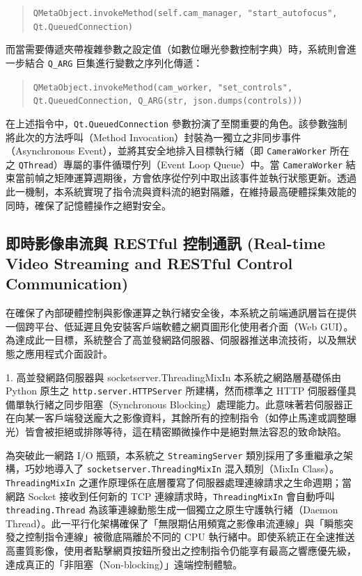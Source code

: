 \begin{quote}
\texttt{QMetaObject.invokeMethod(self.cam\_manager, "start\_autofocus", Qt.QueuedConnection)}
\end{quote}

而當需要傳遞夾帶複雜參數之設定值（如數位曝光參數控制字典）時，系統則會進一步結合 \texttt{Q\_ARG} 巨集進行變數之序列化傳遞：

\begin{quote}
\texttt{QMetaObject.invokeMethod(cam\_worker, "set\_controls", Qt.QueuedConnection, Q\_ARG(str, json.dumps(controls)))}
\end{quote}

在上述指令中，\texttt{Qt.QueuedConnection} 參數扮演了至關重要的角色。該參數強制將此次的方法呼叫（Method Invocation）封裝為一獨立之非同步事件（Asynchronous Event），並將其安全地排入目標執行緒（即 \texttt{CameraWorker} 所在之 \texttt{QThread}）專屬的事件循環佇列（Event Loop Queue）中。當 \texttt{CameraWorker} 結束當前幀之矩陣運算週期後，方會依序從佇列中取出該事件並執行狀態更新。透過此一機制，本系統實現了指令流與資料流的絕對隔離，在維持最高硬體採集效能的同時，確保了記憶體操作之絕對安全。

\subsection{即時影像串流與 RESTful 控制通訊 (Real-time Video Streaming and RESTful Control Communication)}
在確保了內部硬體控制與影像運算之執行緒安全後，本系統之前端通訊層旨在提供一個跨平台、低延遲且免安裝客戶端軟體之網頁圖形化使用者介面（Web GUI）。為達成此一目標，系統整合了高並發網路伺服器、伺服器推送串流技術，以及無狀態之應用程式介面設計。

1. 高並發網路伺服器與 socketserver.ThreadingMixIn
本系統之網路層基礎係由 Python 原生之 \texttt{http.server.HTTPServer} 所建構，然而標準之 HTTP 伺服器僅具備單執行緒之同步阻塞（Synchronous Blocking）處理能力。此意味著若伺服器正在向某一客戶端發送龐大之影像資料，其餘所有的控制指令（如停止馬達或調整曝光）皆會被拒絕或排隊等待，這在精密顯微操作中是絕對無法容忍的致命缺陷。

為突破此一網路 I/O 瓶頸，本系統之 \texttt{StreamingServer} 類別採用了多重繼承之架構，巧妙地導入了 \texttt{socketserver.ThreadingMixIn} 混入類別（MixIn Class）。\texttt{ThreadingMixIn} 之運作原理係在底層覆寫了伺服器處理連線請求之生命週期；當網路 Socket 接收到任何新的 TCP 連線請求時，\texttt{ThreadingMixIn} 會自動呼叫 \texttt{threading.Thread} 為該筆連線動態生成一個獨立之原生守護執行緒（Daemon Thread）。此一平行化架構確保了「無限期佔用頻寬之影像串流連線」與「瞬態突發之控制指令連線」被徹底隔離於不同的 CPU 執行緒中。即使系統正在全速推送高畫質影像，使用者點擊網頁按鈕所發出之控制指令仍能享有最高之響應優先級，達成真正的「非阻塞（Non-blocking）」遠端控制體驗。

